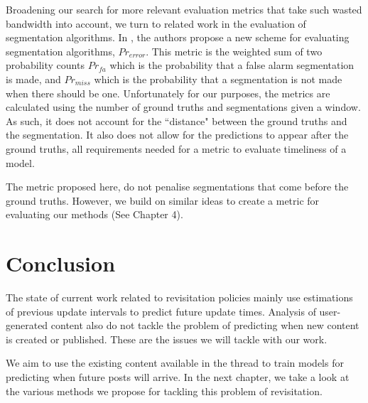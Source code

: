 Broadening our search for more relevant evaluation metrics that take such
wasted bandwidth into account, we turn to related work in the evaluation of
segmentation algorithms.  In , the authors propose a
new scheme for evaluating segmentation algorithms, $Pr_{error}$. This metric is 
the weighted sum of two probability counts $Pr_{fa}$ which is the probability 
that a false alarm segmentation is made, and $Pr_{miss}$ which is the 
probability that a segmentation is not made when there should be one.  
Unfortunately for our purposes, the metrics are calculated using the number of 
ground truths and segmentations given a window. As such, it does not account for 
the ``distance" between the ground truths and the segmentation. It also does not 
allow for the predictions to appear after the ground truths, all requirements 
needed for a metric to evaluate timeliness of a model.

The metric proposed here, do not penalise segmentations that come before the 
ground truths. However, we build on similar ideas to create a metric for 
evaluating our methods (See Chapter 4).

\section{Conclusion}
The state of current work related to revisitation policies mainly use 
estimations of previous update intervals to predict future update times.  
Analysis of user-generated content also do not tackle the problem of predicting 
when new content is created or published. These are the issues we will tackle 
with our work.

We aim to use the existing content available in the thread to train models for 
predicting when future posts will arrive. In the next chapter, we take a look at 
the various methods we propose for tackling this problem of revisitation.

